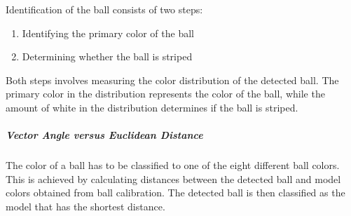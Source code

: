 Identification of the ball consists of two steps:
\begin{enumerate}
  \item Identifying the primary color of the ball
  \item Determining whether the ball is striped
\end{enumerate}
Both steps involves measuring the color distribution of the detected ball. The primary color in the distribution represents the color of the ball, while the amount of white in the distribution determines if the ball is striped.

\subparagraph{Vector Angle versus Euclidean Distance}
The color of a ball has to be classified to one of the eight different ball colors. This is achieved by calculating distances between the detected ball and model colors obtained from ball calibration. The detected ball is then classified as the model that has the shortest distance.

